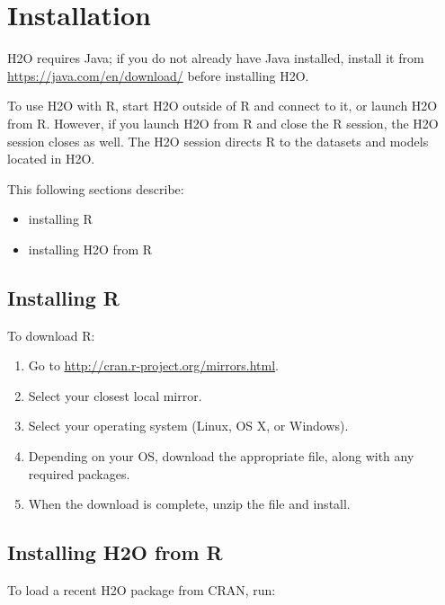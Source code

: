 {\begin{enumerate}
\end{enumerate}




\section{Installation}
H2O requires Java; if you do not already have Java installed, install it from {\url{https://java.com/en/download/}} before installing H2O.

To use H2O with R, start H2O outside of R and connect to it, or launch H2O from R. However, if you launch H2O from R and close the R session, the H2O session closes as well. The H2O session directs R to the datasets and models located in H2O.

This following sections describe:

\begin{itemize}
\item installing R
\item installing H2O from R
\end{itemize}

\subsection{Installing R}

To download R:
\begin{enumerate}
\item Go to \url{http://cran.r-project.org/mirrors.html}.
\item Select your closest local mirror.
\item Select your operating system (Linux, OS X, or Windows).
\item Depending on your OS, download the appropriate file, along with any required packages.
\item When the download is complete, unzip the file and install. \\
\end{enumerate}

\subsection{Installing H2O from R}

To load a recent H2O package from CRAN, run:

\waterExampleInR
\medskip


}
